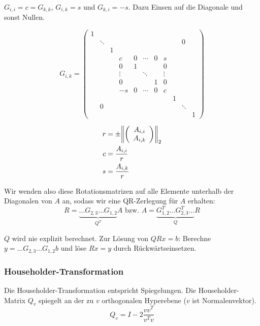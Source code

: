 \documentclass[a4paper,parskip=half*,DIV=15,fontsize=11pt]{scrartcl}
\DeclarePairedDelimiter\norm{\lVert}{\rVert}
\begin{document}
$G_{i,i} = c = G_{k,k}$, $G_{i,k} = s$ und $G_{k,i} = -s$. Dazu Einsen auf die Diagonale und sonst Nullen.
\begin{minipage}{0.7\textwidth}
\[
  G_{i,k} = \left(\begin{array}{ccccccccccc}
    1 \\
    & \ddots  & & & & & & & & 0 \\
    & & 1 \\
    & & & c & 0 & \cdots  & 0 & s \\
    & & & 0 & 1 & & & 0 \\
    & & & \vdots  & & \ddots  & & \vdots  \\
    & & & 0 & & & 1 & 0 \\
    & & & -s  & 0 & \cdots  & 0 & c \\
    & & & & & & & & 1 \\
    & 0 & & & & & & & & \ddots  \\
    & & & & & & & & & & 1
  \end{array}\right)
\]
\end{minipage}
\begin{minipage}{0.3\textwidth}
\begin{align*}
   r &= \pm\norm*{\left(\begin{array}{c}
   A_{i,i}  \\  A_{i,k}
   \end{array}\right)}_2  \\
   c &= \frac{A_{i,i}}{r} \\
   s &= \frac{A_{i,k}}{r}
\end{align*}
\end{minipage}

Wir wenden also diese Rotationsmatrizen auf alle Elemente unterhalb der Diagonalen von $A$ an, sodass wir eine QR-Zerlegung für $A$ erhalten:
\[ R = \underbrace{\ldots G_{2,3} \ldots G_{1,2}}_{Q^T} A \text{ bzw. }  A = \underbrace{G_{1,2}^T \ldots G_{2,3}^T \ldots}_{Q} R \]

$Q$ wird nie explizit berechnet. Zur Lösung von $QRx = b$: Berechne $y = \ldots G_{2,3} \ldots G_{1,2} b$ und löse $Rx = y$ durch Rückwärtseinsetzen.

\subsubsection{Householder-Transformation}

Die Householder-Transformation entspricht Spiegelungen. Die Householder-Matrix $Q_v$ spiegelt an der zu $v$ orthogonalen Hyperebene ($v$ ist Normalenvektor).
\[ Q_v = I - 2 \frac{v v^T}{v^T v} \]
\end{document}
